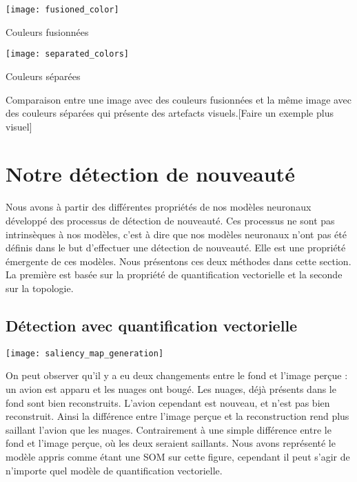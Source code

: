 	\begin{figureth}
		\begin{subfigureth}{0.48\textwidth}
			\texttt{[image: fusioned\_color]}\caption{Couleurs fusionnées}	
		\end{subfigureth}
		\begin{subfigureth}{0.48\textwidth}
			\texttt{[image: separated\_colors]}\caption{Couleurs séparées}	
		\end{subfigureth}
		\caption[Représentation d'une image]{Comparaison entre une image avec des couleurs fusionnées et la même image avec des couleurs séparées qui présente des artefacts visuels.[Faire un exemple plus visuel]}\label{fig:img:rep}
	\end{figureth}

	\newpage
	\section{Notre détection de nouveauté}

	Nous avons à partir des différentes propriétés de nos modèles neuronaux développé des processus de détection de nouveauté. Ces processus ne sont pas intrinsèques à nos modèles, c'est à dire que nos modèles neuronaux n'ont pas été définis dans le but d'effectuer une détection de nouveauté. Elle est une propriété émergente de ces modèles. Nous présentons ces deux méthodes dans cette section. La première est basée sur la propriété de quantification vectorielle et la seconde sur la topologie.

	\subsection{Détection avec quantification vectorielle}

	\begin{figureth}
		\texttt{[image: saliency\_map\_generation]}
		\caption[Détection de nouveauté par quantification vectorielle]{On peut observer qu'il y a eu deux changements entre le fond et l'image perçue : un avion est apparu et les nuages ont bougé. Les nuages, déjà présents dans le fond sont bien reconstruits. L'avion cependant est nouveau, et n'est pas bien reconstruit. Ainsi la différence entre l'image perçue et la reconstruction rend plus saillant l'avion que les nuages. Contrairement à une simple différence entre le fond et l'image perçue, où les deux seraient saillants. Nous avons représenté le modèle appris comme étant une SOM sur cette figure, cependant il peut s'agir de n'importe quel modèle de quantification vectorielle.}\label{fig:img:vq}
	\end{figureth}

